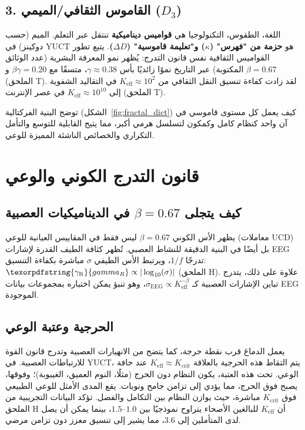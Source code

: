 \documentclass[12pt,a4paper]{article}
\DeclareRobustCommand{\gaR}{\texorpdfstring{\ensuremath{\gamma_{\mathrm{R}}}}{gamma_R}}
\newcommand{\eff}{\mathrm{eff}}
\newcommand{\Ke}{K_{\eff}}
\newcommand{\Kcrit}{K_{\mathrm{crit}}}
\begin{document}
	\subsection{3. القاموس الثقافي/الميمي (\(D_3\))}
	
	اللغة، الطقوس، التكنولوجيا هي \textbf{قواميس ديناميكية} تنتقل عبر التعلم. الميم (حسب دوكينز) في YUCT هو \textbf{حزمة من "فهرس" (\(\kappa\)) و"تعليمة قاموسية" (\(\Delta D\))}. يتبع تطور القواميس الثقافية نفس قانون التدرج: يُظهر نمو المعرفة البشرية (عدد الوثائق المكتوبة) عبر التاريخ نموًا زائديًا بأس \(\gamma \approx 0.38\)، متسقًا مع \(\beta\gamma = 0.20\) و \(\beta = 0.67\) (الملحق T). لقد زادت كفاءة تنسيق النقل الثقافي من \(\Ke \approx 10^2\) في التقاليد الشفوية إلى \(\Ke \approx 10^{10}\) في عصر الإنترنت (الملحق T).
	
	توضح البنية الفركتالية (الشكل~\ref{fig:fractal_dict}) كيف يعمل كل مستوى قاموسي في آن واحد كنظام كامل وكمكون لتسلسل هرمي أكبر، مما يتيح القابلية للتوسع والتأمل التكراري والخصائص الناشئة المميزة للوعي.
	
	\section{قانون التدرج الكوني والوعي}
	
	\subsection{كيف يتجلى \(\beta = 0.67\) في الديناميكيات العصبية}
	
	يظهر الأس الكوني \(\beta = 0.67\) ليس فقط في المقاييس العيانية للوعي (معاملات UCD) بل أيضًا في البنية الدقيقة للنشاط العصبي. تُظهر كثافة الطيف القدرة لإشارات EEG تدرجًا \(1/f\)، ويرتبط الأس الطيفي \(\sigma\) مباشرة بكفاءة التنسيق: \(\gaR \propto |\log_{10}(\sigma)|\) (الملحق H). علاوة على ذلك، يتدرج تباين الإشارات العصبية كـ \(\sigma_{\text{EEG}} \propto \Ke^{-\beta}\)، وهو تنبؤ يمكن اختباره بمجموعات بيانات EEG الموجودة.
	
	\subsection{الحرجية وعتبة الوعي}
	
	يعمل الدماغ قرب نقطة حرجة، كما يتضح من الانهيارات العصبية وتدرج قانون القوة للارتباطات العصبية. في YUCT، يتم التقاط هذه الحرجية بالعلاقة \(\Ke \approx \Kcrit\) عند حافة الوعي. تحت هذه العتبة، يكون النظام دون الحرج (مثلًا، النوم العميق، الغيبوبة)؛ وفوقها، يصبح فوق الحرج، مما يؤدي إلى تزامن جامح ونوبات. يقع المدى الأمثل للوعي الطبيعي فوق \(\Kcrit\) مباشرة، حيث يوازن النظام بين التكامل والفصل. تؤكد البيانات التجريبية من الملحق H أن \(\Ke\) للبالغين الأصحاء يتراوح نموذجيًا بين \(1.0\)--\(1.5\)، بينما يمكن أن يصل لدى المتأملين إلى \(3.6\)، مما يشير إلى تنسيق معزز دون تزامن مرضي.
	
\end{document}
